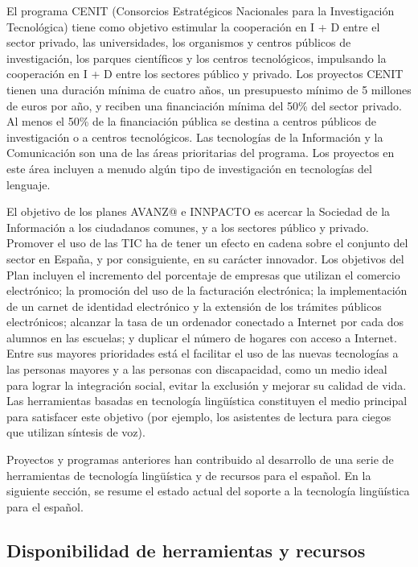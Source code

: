\begin{multicols}{2}
El programa CENIT (Consorcios Estratégicos Nacionales para la Investigación Tecnológica) tiene como objetivo estimular la cooperación en I + D entre el sector privado, las universidades, los organismos y centros públicos de investigación, los parques científicos y los centros tecnológicos, impulsando la cooperación en I + D entre los sectores público y privado. Los proyectos CENIT tienen una duración mínima de cuatro años, un presupuesto mínimo de 5 millones de euros por año, y reciben una financiación mínima del 50\% del sector privado. Al menos el 50\% de la financiación pública se destina a centros públicos de investigación o a centros tecnológicos. Las tecnologías de la Información y la Comunicación son una de las áreas prioritarias del programa. Los proyectos en este área incluyen a menudo algún tipo de investigación en tecnologías del lenguaje.

El objetivo de los planes AVANZ@ e INNPACTO es acercar la Sociedad de la Información a los ciudadanos comunes, y a los sectores público y privado. Promover el uso de las TIC ha de tener un efecto en cadena sobre el conjunto del sector en España, y por consiguiente, en su carácter innovador. Los objetivos del Plan incluyen el incremento del porcentaje de empresas que utilizan el comercio electrónico; la promoción del uso de la facturación electrónica; la  implementación de un carnet de identidad electrónico y la extensión de los trámites públicos electrónicos; alcanzar la tasa de un ordenador conectado a Internet por cada dos alumnos en las escuelas; y duplicar el número de hogares con acceso a Internet. Entre sus mayores prioridades está el facilitar el uso de las nuevas tecnologías a las personas mayores y a las personas con discapacidad, como un medio ideal para lograr la integración social, evitar la exclusión y mejorar su calidad de vida. Las herramientas basadas en tecnología lingüística constituyen el medio principal para satisfacer este objetivo  (por ejemplo, los asistentes de lectura para ciegos que utilizan síntesis de voz).
\columnbreak

Proyectos y programas anteriores han contribuido al desarrollo de una serie de herramientas de tecnología lingüística y de recursos para el español. En la siguiente sección, se resume el estado actual del soporte a la tecnología lingüística para el español.  

\subsection{Disponibilidad de herramientas y recursos}


\end{multicols}
